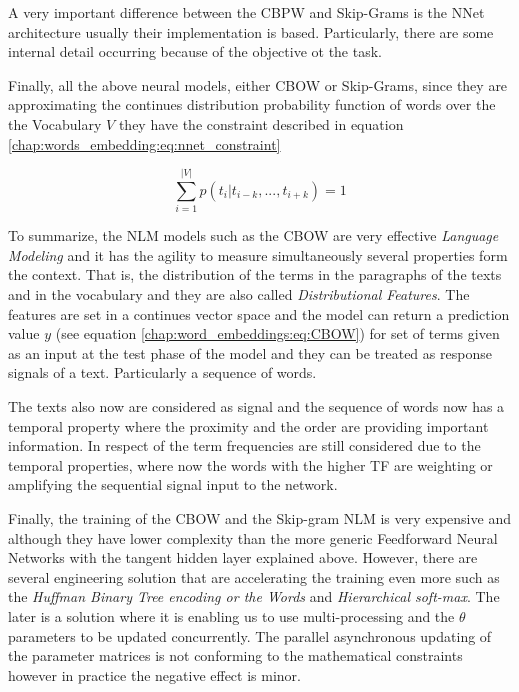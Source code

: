 A very important difference between the CBPW and Skip-Grams is the NNet architecture usually their implementation is based. Particularly, there are some internal detail occurring because of the objective ot the task. \parencite{boden2002guide}

Finally, all the above neural models, either CBOW or Skip-Grams, since they are approximating the continues distribution probability function of words over the the Vocabulary $V$ they have the constraint described in equation \ref{chap:words_embedding:eq:nnet_constraint}

\begin{equation} \label{chap:word_embeddings:eq:nnet_condtraint}
	\sum_{i=1}^{|V|}{p(t_{i}|t_{i-k}, ... ,t_{i+k})} = 1
\end{equation}

To summarize, the NLM models such as the CBOW are very effective \textit{Language Modeling} and it has the agility to measure simultaneously several properties form the context. That is, the distribution of the terms in the paragraphs of the texts and in the vocabulary and they are also called \textit{Distributional Features}. The features are set in a continues vector space and the model can return a prediction value $y$ (see equation \ref{chap:word_embeddings:eq:CBOW}) for set of terms given as an input at the test phase of the model and they can be treated as response signals of a text. Particularly a sequence of words.

The texts also now are considered as signal and the sequence of words now has a temporal property where the proximity and the order are providing important information. In respect of the term frequencies are still considered due to the temporal properties, where now the words with the higher TF are weighting or amplifying the sequential signal input to the network.

Finally, the training of the CBOW and the Skip-gram NLM is very expensive and although they have lower complexity than the more generic Feedforward Neural Networks with the tangent hidden layer explained above. However, there are several engineering solution that are accelerating the training even more such as the \textit{Huffman Binary Tree encoding or the Words} and \textit{Hierarchical soft-max}. The later is a solution where it is enabling us to use multi-processing and the $\theta$ parameters to be updated concurrently. The parallel asynchronous updating of the parameter matrices is not conforming to the mathematical constraints however in practice the negative effect is minor. 

